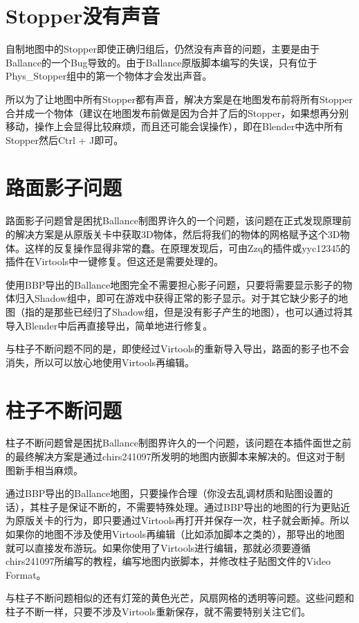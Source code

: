 
\section{Stopper没有声音}

自制地图中的Stopper即使正确归组后，仍然没有声音的问题，主要是由于Ballance的一个Bug导致的。由于Ballance原版脚本编写的失误，只有位于Phys\_Stopper组中的第一个物体才会发出声音。

所以为了让地图中所有Stopper都有声音，解决方案是在地图发布前将所有Stopper合并成一个物体（建议在地图发布前做是因为合并了后的Stopper，如果想再分别移动，操作上会显得比较麻烦，而且还可能会误操作），即在Blender中选中所有Stopper然后Ctrl + J即可。

\section{路面影子问题}

路面影子问题曾是困扰Ballance制图界许久的一个问题，该问题在正式发现原理前的解决方案是从原版关卡中获取3D物体，然后将我们的物体的网格赋予这个3D物体。这样的反复操作显得非常的蠢。在原理发现后，可由Zzq的插件或yyc12345的插件在Virtools中一键修复。但这还是需要处理的。

使用BBP导出的Ballance地图完全不需要担心影子问题，只要将需要显示影子的物体归入Shadow组中，即可在游戏中获得正常的影子显示。对于其它缺少影子的地图（指的是那些已经归了Shadow组，但是没有影子产生的地图），也可以通过将其导入Blender中后再直接导出，简单地进行修复。

与柱子不断问题不同的是，即使经过Virtools的重新导入导出，路面的影子也不会消失，所以可以放心地使用Virtools再编辑。

\section{柱子不断问题}

柱子不断问题曾是困扰Ballance制图界许久的一个问题，该问题在本插件面世之前的最终解决方案是通过chirs241097所发明的地图内嵌脚本来解决的。但这对于制图新手相当麻烦。

通过BBP导出的Ballance地图，只要操作合理（你没去乱调材质和贴图设置的话），其柱子是保证不断的，不需要特殊处理。通过BBP导出的地图的行为更贴近为原版关卡的行为，即只要通过Virtools再打开并保存一次，柱子就会断掉。所以如果你的地图不涉及使用Virtools再编辑（比如添加脚本之类的），那导出的地图就可以直接发布游玩。如果你使用了Virtools进行编辑，那就必须要遵循chirs241097所编写的教程，编写地图内嵌脚本，并修改柱子贴图文件的Video Format。

与柱子不断问题相似的还有灯笼的黄色光芒，风扇网格的透明等问题。这些问题和柱子不断一样，只要不涉及Virtools重新保存，就不需要特别关注它们。
